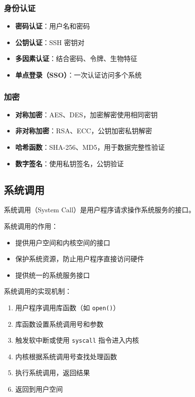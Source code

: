 \subsubsection{身份认证}

\begin{itemize}
  \item \textbf{密码认证}：用户名和密码
  \item \textbf{公钥认证}：SSH 密钥对
  \item \textbf{多因素认证}：结合密码、令牌、生物特征
  \item \textbf{单点登录（SSO）}：一次认证访问多个系统
\end{itemize}

\subsubsection{加密}

\begin{itemize}
  \item \textbf{对称加密}：AES、DES，加密解密使用相同密钥
  \item \textbf{非对称加密}：RSA、ECC，公钥加密私钥解密
  \item \textbf{哈希函数}：SHA-256、MD5，用于数据完整性验证
  \item \textbf{数字签名}：使用私钥签名，公钥验证
\end{itemize}

\subsection{系统调用}

系统调用（System Call）是用户程序请求操作系统服务的接口。


系统调用的作用：
\begin{itemize}
  \item 提供用户空间和内核空间的接口
  \item 保护系统资源，防止用户程序直接访问硬件
  \item 提供统一的系统服务接口
\end{itemize}

系统调用的实现机制：
\begin{enumerate}
  \item 用户程序调用库函数（如 \texttt{open()}）
  \item 库函数设置系统调用号和参数
  \item 触发软中断或使用 \texttt{syscall} 指令进入内核
  \item 内核根据系统调用号查找处理函数
  \item 执行系统调用，返回结果
  \item 返回到用户空间
\end{enumerate}

